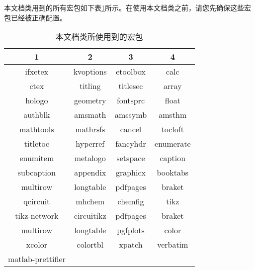 本文档类用到的所有宏包如下表\ref{tab:dependencies}所示。在使用本文档类之前，请您先确保这些宏包已经被正确配置。

\begin{table}[H]
  \centering
  \caption{本文档类所使用到的宏包}\label{tab:dependencies}
  \begin{tabular}{cccc}
    \toprule
    1 & 2 & 3 & 4 \\
    \midrule
    ifxetex & kvoptions & etoolbox & calc \\
    ctex & titling & titlesec & array \\
    hologo & geometry & fontsprc & float \\
    authblk & amsmath & amssymb & amsthm \\
    mathtools & mathrsfs & cancel & tocloft \\
    titletoc & hyperref & fancyhdr & enumerate \\
    enumitem & metalogo & setspace & caption \\
    subcaption & appendix & graphicx & booktabs \\
    multirow & longtable & pdfpages & braket \\
    qcircuit & mhchem & chemfig & tikz \\
    tikz-network & circuitikz & pdfpages & braket \\
    multirow & longtable & pgfplots & color \\
    xcolor & colortbl & xpatch & verbatim \\
    matlab-prettifier &   &   &   \\
    \bottomrule
  \end{tabular}
\end{table}